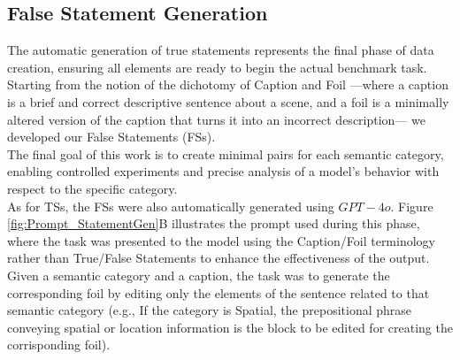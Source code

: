 \begin{table}
  \caption{\label{Table: loverlap_TTR_Captions}
    Lexical Overlap and TTR Statistics (Type-token and Content word-only) before and after Automatic Sentence Rephrasing with \textit{GPT-4o} for 19200 TSs.
  }
\end{table}


\subsection{False Statement Generation}
\label{subsec:FoilGen}

The automatic generation of true statements represents the final phase of data creation, ensuring all elements are ready to begin the actual benchmark task. Starting from the notion of the dichotomy of Caption and Foil —where a caption is a brief and correct descriptive sentence about a scene, and a foil is a minimally altered version of the caption that turns it into an incorrect description— we developed our False Statements (FSs).\\ The final goal of this work is to create minimal pairs for each semantic category, enabling controlled experiments and precise analysis of a model's behavior with respect to the specific category.\\ As for TSs, the FSs were also automatically generated using $GPT-4o$. Figure \ref{fig:Prompt_StatementGen}B illustrates the prompt used during this phase, where the task was presented to the model using the Caption/Foil terminology rather than True/False Statements to enhance the effectiveness of the output. Given a semantic category and a caption, the task was to generate the corresponding foil by editing only the elements of the sentence related to that semantic category (e.g., If the category is Spatial, the prepositional phrase conveying spatial or location information is the block to be edited for creating the corrisponding foil).

